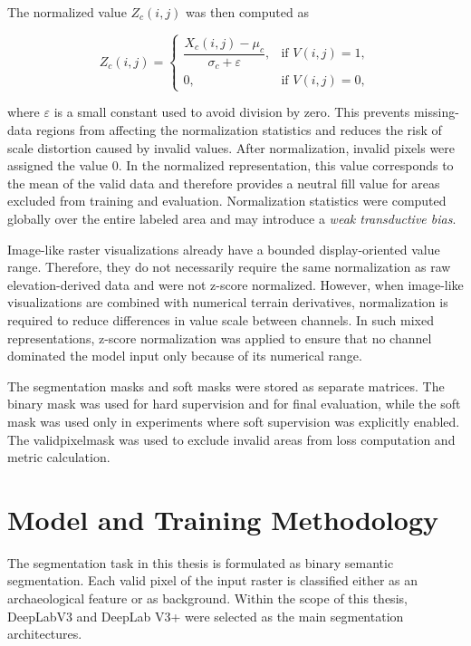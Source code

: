 The normalized value \(Z_c(i,j)\) was then computed as

\begin{equation}
Z_c(i,j) =
\begin{cases}
\dfrac{X_c(i,j)-\mu_c}{\sigma_c + \varepsilon}, & \text{if } V(i,j)=1, \\
0, & \text{if } V(i,j)=0,
\end{cases}
\label{eq:zscore_normalization}
\end{equation}

where \(\varepsilon\) is a small constant used to avoid division by zero.
This prevents missing-data regions from affecting the normalization statistics and reduces the risk of scale distortion caused by invalid values. After normalization, invalid pixels were assigned the value 0. In the normalized representation, this value corresponds to the mean of the valid data and therefore provides a neutral fill value for areas excluded from training and evaluation. Normalization statistics were computed globally over the entire labeled area and may introduce a \textit{weak transductive bias}.

Image-like raster visualizations already have a bounded display-oriented value range. Therefore, they do not necessarily require the same normalization as raw elevation-derived data and were not z-score normalized. However, when image-like visualizations are combined with numerical terrain derivatives, normalization is required to reduce differences in value scale between channels. In such mixed representations, z-score normalization was applied to ensure that no channel dominated the model input only because of its numerical range.

The segmentation masks and soft masks were stored as separate matrices. The binary mask was used for hard supervision and for final evaluation, while the soft mask was used only in experiments where soft supervision was explicitly enabled. The \gls{validpixelmask} was used to exclude invalid areas from loss computation and metric calculation.

\section{Model and Training Methodology}\label{sec:model_training_methodology}

The segmentation task in this thesis is formulated as binary semantic segmentation. Each valid pixel of the input raster is classified either as an archaeological feature or as background. Within the scope of this thesis, DeepLabV3 and DeepLab V3+ were selected as the main segmentation architectures.

